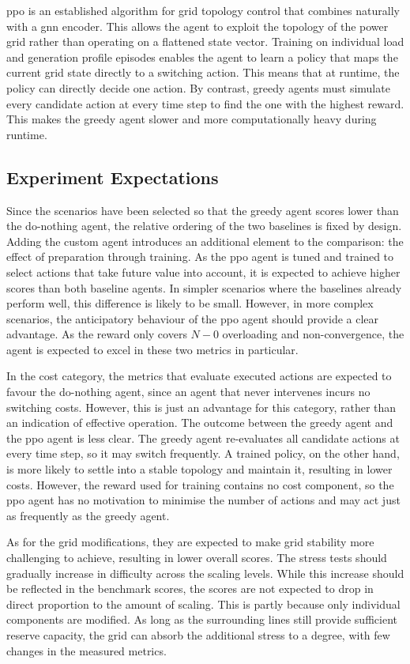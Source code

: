 \ac{ppo} is an established algorithm for grid topology control that combines naturally with a \ac{gnn} encoder. This allows the agent to exploit the topology of the power grid rather than operating on a flattened state vector. Training on individual load and generation profile episodes enables the agent to learn a policy that maps the current grid state directly to a switching action. This means that at runtime, the policy can directly decide one action. By contrast, greedy agents must simulate every candidate action at every time step to find the one with the highest reward. This makes the greedy agent slower and more computationally heavy during runtime. 

\subsection{Experiment Expectations}\label{ssec:exp-expectation}
Since the scenarios have been selected so that the greedy agent scores lower than the do-nothing agent, the relative ordering of the two baselines is fixed by design. Adding the custom agent introduces an additional element to the comparison: the effect of preparation through training. As the \ac{ppo} agent is tuned and trained to select actions that take future value into account, it is expected to achieve higher scores than both baseline agents. In simpler scenarios where the baselines already perform well, this difference is likely to be small. However, in more complex scenarios, the anticipatory behaviour of the \ac{ppo} agent should provide a clear advantage. As the reward only covers $N-0$ overloading and non-convergence, the agent is expected to excel in these two metrics in particular.

In the cost category, the metrics that evaluate executed actions are expected to favour the do-nothing agent, since an agent that never intervenes incurs no switching costs. However, this is just an advantage for this category, rather than an indication of effective operation. The outcome between the greedy agent and the \ac{ppo} agent is less clear. The greedy agent re-evaluates all candidate actions at every time step, so it may switch frequently. A trained policy, on the other hand, is more likely to settle into a stable topology and maintain it, resulting in lower costs. However, the reward used for training contains no cost component, so the \ac{ppo} agent has no motivation to minimise the number of actions and may act just as frequently as the greedy agent.

As for the grid modifications, they are expected to make grid stability more challenging to achieve, resulting in lower overall scores. The stress tests should gradually increase in difficulty across the scaling levels. While this increase should be reflected in the benchmark scores, the scores are not expected to drop in direct proportion to the amount of scaling. This is partly because only individual components are modified. As long as the surrounding lines still provide sufficient reserve capacity, the grid can absorb the additional stress to a degree, with few changes in the measured metrics. 

